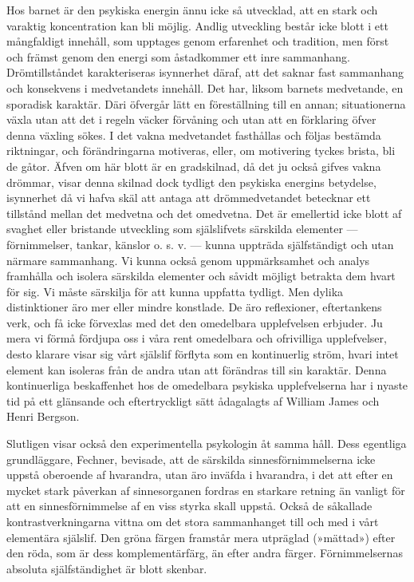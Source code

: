 \documentclass[12pt]{article}
\newcommand{\opage}[1]{\marginnote{\footnotesize\textit{[#1]}}}
\begin{document}
Hos barnet är den psykiska energin ännu icke så utvecklad, att en stark och varaktig koncentration kan bli möjlig. Andlig utveckling består icke blott i ett mångfaldigt innehåll, som upptages genom erfarenhet och tradition, men först och främst genom den energi som åstadkommer ett inre sammanhang. Drömtillståndet karakteriseras isynnerhet däraf, att det saknar fast sammanhang och konsekvens i medvetandets innehåll. Det har, liksom barnets medvetande, en sporadisk karaktär. Däri öfvergår lätt en föreställning till en annan; situationerna växla utan att det i regeln väcker förvåning och utan att en förklaring öfver denna växling sökes. I det vakna medvetandet fasthållas och följas bestämda riktningar, och förändringarna motiveras, eller, om motivering tyckes brista, bli de gåtor. Äfven om här blott är en gradskilnad, då det ju också gifves vakna drömmar, visar denna skilnad dock tydligt den psykiska energins betydelse, isynnerhet då vi hafva skäl att antaga att drömmedvetandet betecknar ett tillstånd mellan det medvetna och det omedvetna. %
\opage{32}
Det är emellertid icke blott af svaghet eller bristande utveckling som  själslifvets särskilda elementer --- förnimmelser, tankar, känslor o. s. v. --- kunna uppträda själfständigt och utan närmare sammanhang. Vi kunna också genom uppmärksamhet och analys framhålla och isolera särskilda elementer och såvidt möjligt betrakta dem hvart för sig. Vi måste särskilja för att kunna uppfatta tydligt. Men dylika distinktioner äro mer eller mindre konstlade. De äro reflexioner, eftertankens verk, och få icke förvexlas med det den omedelbara upplefvelsen erbjuder. Ju mera vi förmå fördjupa oss i våra rent omedelbara och ofrivilliga upplefvelser, desto klarare visar sig vårt själslif förflyta som en kontinuerlig ström, hvari intet element kan isoleras från de andra utan att förändras till sin karaktär. Denna kontinuerliga beskaffenhet hos de omedelbara psykiska upplefvelserna har i nyaste tid på ett glänsande och eftertryckligt sätt ådagalagts af William James och Henri Bergson.

Slutligen visar också den experimentella psykologin åt samma håll. Dess egentliga grundläggare, Fechner, bevisade, %
\opage{33}
att de särskilda sinnesförnimmelserna icke uppstå oberoende af hvarandra, utan äro inväfda i hvarandra, i det att efter en mycket stark påverkan af sinnesorganen fordras en starkare retning än vanligt för att en sinnesförnimmelse af en viss styrka skall uppstå. Också de såkallade kontrastverkningarna vittna om det stora sammanhanget till och med i vårt elementära själslif. Den gröna färgen framstår mera utpräglad (»mättad») efter den röda, som är dess komplementärfärg, än efter andra färger. Förnimmelsernas absoluta själfständighet är blott skenbar.
\end{document}
